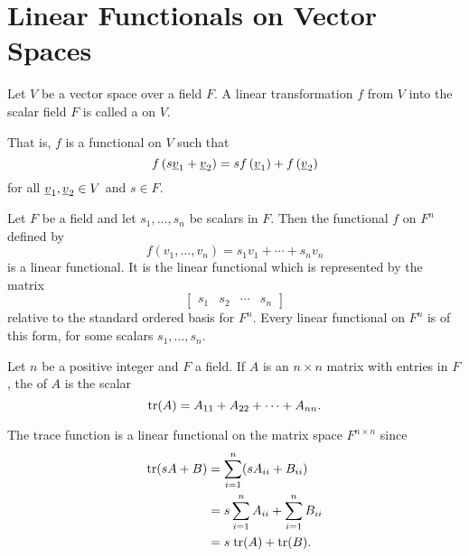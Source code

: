 \section{Linear Functionals on Vector Spaces}

\begin{definition}
Let $V$ be a vector space over a field $F$.
A linear transformation $f$ from $V$ into the scalar field $F$ is called a  on $V$.
\end{definition}
That is, $f$ is a functional on $V$ such that
\begin{equation*}
f \left( s \underline{v}_1 + \underline{v}_2 \right)
= s f \left( \underline{v}_1 \right) + f \left( \underline{v}_2 \right)
\end{equation*}
for all $\underline{v}_1, \underline{v}_2 \in V$ and $s \in F$.

\begin{example}
Let $F$ be a field and let $s_1, \ldots, s_n$ be scalars in $F$.
Then the functional $f$ on $F^n$ defined by
\begin{equation*}
f(v_1, \ldots, v_n) = s_1 v_1 + \cdots + s_n v_n
\end{equation*}
is a linear functional.
It is the linear functional which is represented by the matrix
\begin{equation*}
\left[ \begin{array}{cccc} s_1 & s_2 & \cdots & s_n \end{array} \right]
\end{equation*}
relative to the standard ordered basis for $F^n$.
Every linear functional on $F^n$ is of this form, for some scalars $s_1, \ldots, s_n$.
\end{example}

\begin{definition}
Let $n$ be a positive integer and $F$ a field.
If $A$ is an $n \times n$ matrix with entries in $F$, the  of $A$ is the scalar
\begin{equation*}
\mathrm{tr}(A) = A_{11} + A_{22} + \cdots + A_{nn}.
\end{equation*}
\end{definition}

\begin{example}
The trace function is a linear functional on the matrix space $F^{n \times n}$ since
\begin{equation*}
\begin{split}
\mathrm{tr} ( sA + B) &= \sum_{i=1}^n (s A_{ii} + B_{ii}) \\
&= s \sum_{i=1}^n A_{ii} + \sum_{i=1}^n  B_{ii} \\
&= s \; \mathrm{tr}(A) + \mathrm{tr}(B) .
\end{split}
\end{equation*}
\end{example}

